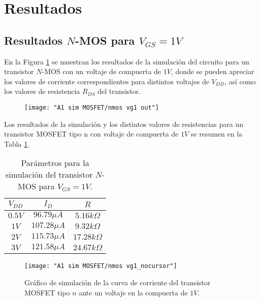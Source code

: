 \documentclass[9pt,technote]{IEEEtran}
\begin{document}
	
	
	
	
	\section*{Resultados}
	
	\subsection*{Resultados $N$-MOS para $V_{GS}=1V$}
	En la Figura \ref{fig:nmos-vg1-out} se muestran los resultados de la simulación del circuito para un transistor $N$-MOS con un voltaje de compuerta de $1V$, donde se pueden apreciar los valores de corriente correspondientes para distintos voltajes de $V_{DD}$, así como los valores de resistencia $R_{DS}$ del transistor.
    
    \begin{figure}[H]
    	\centering
    	\texttt{[image: "A1 sim MOSFET/nmos vg1 out"]}
    	\caption{}
    	\label{fig:nmos-vg1-out}
    \end{figure}
    
    Los resultados de la simulación y los distintos valores de resistencias para un transistor MOSFET tipo n con voltaje de compuerta de $1V$ se resumen en la Tabla \ref{Tabla:res_VG1_nmos:1}. 
    
    \begin{table}[H]
    	\centering
    	\begin{tabular}{|c|c|c|}
    		\hline
    		$V_{DD}$ & $I_{D}$ & $R$\\
    		\hline
    		$0.5V$ & $96.79 \mu A$ & $5.16 k\Omega$\\ 
    		$1V$ & $107.28 \mu A$ &  $9.32 k\Omega$\\ 
    		$2V$ & $115.73 \mu A$ &  $17.28 k\Omega$\\
    		$3V$ & $121.58 \mu A$ &  $24.67 k\Omega$\\
    		\hline
    	\end{tabular}
    	\caption{Parámetros para la simulación del transistor $N$-MOS para $V_{GS}=1V$.}
    	\label{Tabla:res_VG1_nmos:1}
    \end{table}
    
	\begin{figure}[H]
		\centering
		\texttt{[image: "A1 sim MOSFET/nmos vg1\_nocursor"]}
		\caption{Gráfico de simulación de la curva de corriente del transistor MOSFET tipo $n$ ante un voltaje en la compuerta de $1V$.}
		\label{fig:nmos-vg1nocursor}
	\end{figure}
	
\end{document}
